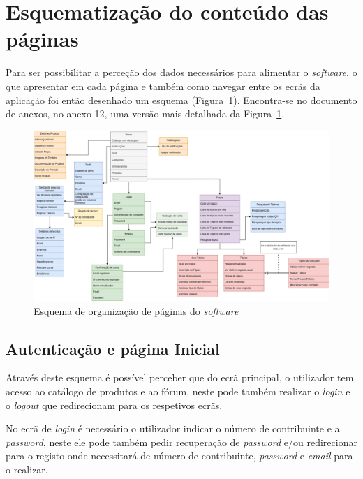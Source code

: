 \section{Esquematização do conteúdo das páginas}

Para ser possibilitar a perceção dos dados necessários para alimentar o \textit{software}, o que apresentar em cada página e também como navegar entre os ecrãs da aplicação foi então desenhado um esquema 
(Figura~\ref{fig:3}).  Encontra-se no documento de anexos, no anexo 12, uma versão mais detalhada da Figura~\ref*{fig:3}.

\begin{figure}[htb]
  \centering
  
  \includegraphics[width=\textwidth]{images/Arquiteturas/diagrama_superficial_de_aplicacao.png}
  \caption{Esquema de organização de páginas do \textit{software}}
  \label{fig:3}
\end{figure}

\newpage

\subsection{Autenticação e página Inicial}

Através deste esquema é possível perceber que do ecrã principal, o utilizador tem acesso ao 
catálogo de produtos e ao fórum, neste pode também realizar o \textit{login} e o \textit{logout} que redirecionam para os respetivos ecrãs.

No ecrã de \textit{login} é necessário o utilizador indicar o número de contribuinte e a \textit{password}, neste ele pode também pedir recuperação de \textit{password} e/ou redirecionar para o registo onde necessitará de número de contribuinte, \textit{password} e \textit{email} para o realizar.

